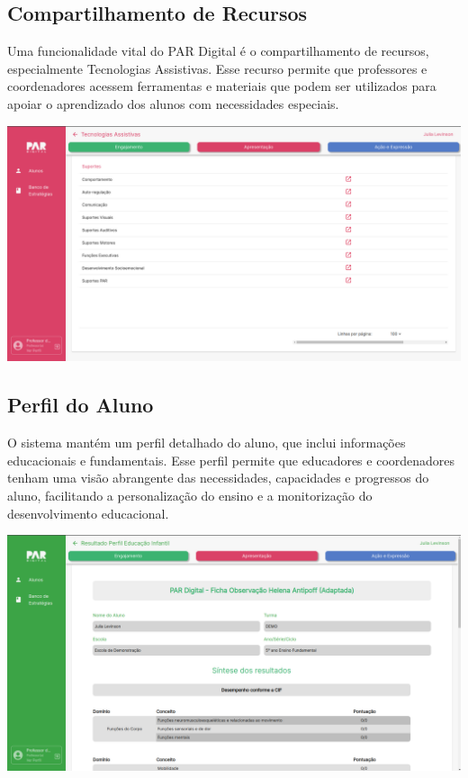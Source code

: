 \documentclass[sigconf]{webmedia}
\begin{document}
\subsection{Compartilhamento de Recursos}
Uma funcionalidade vital do PAR Digital é o compartilhamento de 
recursos, especialmente Tecnologias Assistivas. Esse recurso 
permite que professores e coordenadores acessem ferramentas e 
materiais que podem ser utilizados para apoiar o aprendizado 
dos alunos com necessidades especiais.
\vspace{0.5cm}

\includegraphics[scale=0.12]{./imgs/materialAdd}

\subsection{Perfil do Aluno}
O sistema mantém um perfil detalhado do aluno, que inclui informações
 educacionais e fundamentais. Esse perfil permite que educadores e 
 coordenadores tenham uma visão abrangente das necessidades, 
 capacidades e progressos do aluno, facilitando a personalização 
 do ensino e a monitorização do desenvolvimento educacional.
 \vspace{0.5cm}

\includegraphics[scale=0.12]{./imgs/perfil}
\end{document}
